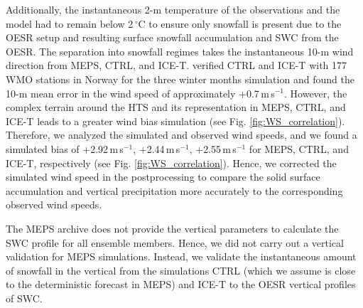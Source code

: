 \documentclass{ametsocV5}
\begin{document}
		Additionally, the instantaneous 2-m temperature of the observations and the model had to remain below 2\,$^{\circ}$C to ensure only snowfall is present due to the OESR setup and resulting surface snowfall accumulation and SWC from the OESR. The separation into snowfall regimes takes the instantaneous 10-m wind direction from MEPS, CTRL, and ICE-T. \citet{engdahl_effects_2020} verified CTRL and ICE-T with 177 WMO stations in Norway for the three winter months simulation and found the 10-m mean error in the wind speed of approximately +0.7\,m\,s$^{-1}$. However, the complex terrain around the HTS and its representation in MEPS, CTRL, and ICE-T leads to a greater wind bias simulation (see Fig. \ref{fig:WS_correlation}). Therefore, we analyzed the simulated and observed wind speeds, and we found a simulated bias of +2.92\,m\,s$^{-1}$, +2.44\,m\,s$^{-1}$, +2.55\,m\,s$^{-1}$ for MEPS, CTRL, and ICE-T, respectively (see Fig. \ref{fig:WS_correlation}). Hence, we corrected the simulated wind speed in the postprocessing to compare the solid surface accumulation and vertical precipitation more accurately to the corresponding observed wind speeds. 
		
		
		The MEPS archive does not provide the vertical parameters to calculate the SWC profile for all ensemble members. Hence, we did not carry out a vertical validation for MEPS simulations. Instead, we validate the instantaneous amount of snowfall in the vertical from the simulations CTRL (which we assume is close to the deterministic forecast in MEPS) and ICE-T to the OESR vertical profiles of SWC.
		
\end{document}
